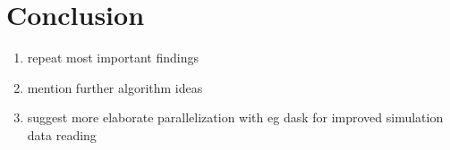 \chapter{Conclusion}\label{sec:conclusion}
\begin{enumerate}
    \item repeat most important findings
    \item mention further algorithm ideas
    \item suggest more elaborate parallelization with eg dask for improved simulation data reading
\end{enumerate}